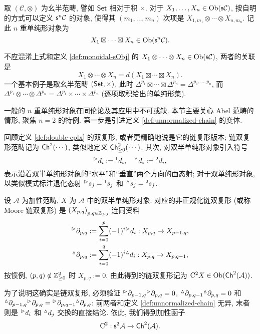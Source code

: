 \begin{example}\label{eg:boxtimes-bisimplicial}
	取 $(\mathcal{C}, \otimes)$ 为幺半范畴, 譬如 $\mathsf{Set}$ 相对于积 $\times$. 对于 $X_1, \ldots, X_n \in \operatorname{Ob}(\mathsf{s}\mathcal{C})$, 按自明的方式可以定义 $\mathsf{s}^n \mathcal{C}$ 的对象, 使得其 $(m_1, \ldots, m_n)$ 次项是 $X_{1, m_1} \otimes \cdots \otimes X_{n, m_n}$. 记此 $n$ 重单纯形对象为
	\[ X_1 \boxtimes \cdots \boxtimes X_n \in \operatorname{Ob}(\mathsf{s}^n \mathcal{C}). \]
	
	不应混淆上式和定义 \ref{def:monoidal-sObj} 的 $X_1 \otimes \cdots \otimes X_n \in \operatorname{Ob}(\mathsf{s}\mathcal{C})$, 两者的关联是
	\[ X_1 \otimes \cdots \otimes X_n = d(X_1 \boxtimes \cdots \boxtimes X_n). \]
	一个基本例子是取幺半范畴 $(\mathsf{Set}, \times)$, 此时 $\Delta^{p_1} \boxtimes \cdots \boxtimes \Delta^{p_n} = \Delta^{p_1, \ldots, p_n}$, 而 $\Delta^{p_1} \otimes \cdots \otimes \Delta^{p_n} = \Delta^{p_1} \times \cdots \times \Delta^{p_n}$ (逐项取积给出的单纯形集).
\end{example}

一般的 $n$ 重单纯形对象在同伦论及其应用中不可或缺. 本节主要关心 Abel 范畴的情形, 聚焦 $n=2$ 的特例. 第一步是引进定义 \ref{def:unnormalized-chain} 的变体.

回顾定义 \ref{def:double-cplx} 的双复形, 或者更精确地说是它的链复形版本; 链双复形范畴记为 $\mathsf{Ch}^2(\cdots)$, 类似地定义 $\mathsf{Ch}^2_{\geq 0}(\cdots)$. 其次, 对双半单纯形对象引入符号
\[ {}^\vartriangleright d_i := {}^1 d_i , \quad {}^\vartriangle d_i := {}^2 d_i, \]
表示沿着双半单纯形对象的``水平''和``垂直''两个方向的面态射; 对于双单纯形对象, 以类似模式标注退化态射 ${}^\vartriangleright s_j = {}^1 s_j$ 和 ${}^\vartriangle s_j = {}^2 s_j$.

\begin{definition}
	设 $\mathcal{A}$ 为加性范畴, $X$ 为 $\mathcal{A}$ 中的双半单纯形对象. 对应的非正规化链双复形 (或称 Moore 链双复形) 是 $\left( X_{p, q} \right)_{p, q \in \mathbb{Z}_{\geq 0}}$ 连同资料
	\begin{align*}
		{}^\vartriangleright \partial_{p, q} & := \sum_{i=0}^p (-1)^i {}^\vartriangleright d_i: X_{p, q} \to X_{p-1, q}, \\
		{}^\vartriangle \partial_{p, q} & := \sum_{i=0}^q (-1)^i {}^\vartriangle d_i: X_{p, q} \to X_{p, q-1},
	\end{align*}
	按惯例, $(p, q) \notin \mathbb{Z}_{\geq 0}^2$ 时 $X_{p,q} := 0$. 由此得到的链双复形记为 $\mathrm{C}^2 X \in \operatorname{Ob}(\mathsf{Ch}^2(\mathcal{A}))$.
\end{definition}

为了说明这确实是链双复形, 必须验证 ${}^\vartriangleright \partial_{p-1, q} {}^\vartriangleright \partial_{p, q} = 0$, ${}^\vartriangle \partial_{p, q-1} {}^\vartriangle \partial_{p, q} = 0$ 和 ${}^\vartriangle \partial_{p-1, q} {}^\vartriangleright \partial_{p, q} = {}^\vartriangleright \partial_{p, q-1} {}^\vartriangle \partial_{p, q}$: 前两者和定义 \ref{def:unnormalized-chain} 无异, 末者则是 ${}^\vartriangleright d_i$ 和 ${}^\vartriangle d_j$ 交换的直接结论. 依此, 我们得到加性函子
\[ \mathrm{C}^2: \mathsf{s}^2 \mathcal{A} \to \mathsf{Ch}^2(\mathcal{A}). \]

